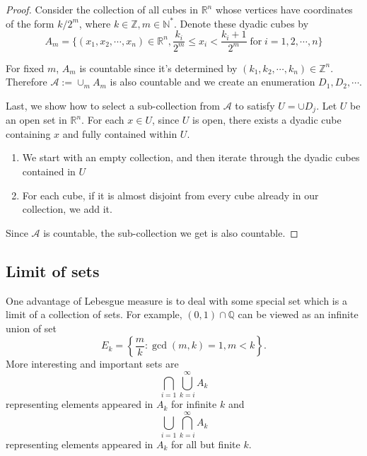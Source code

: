 \documentclass[dvipsnames]{article}
\numberwithin{equation}{section}
\begin{document}
\begin{proof}
Consider the collection of all cubes in $\mathbb{R}^n$ whose vertices have coordinates of the form $k/2^m$, where $k\in\mathbb{Z}, m\in\mathbb{N}^{*}$. Denote these dyadic cubes by 
$$
A_{m}= \{(x_1, x_2, \cdots, x_{n})\in\mathbb{R}^{n}, \frac{k_i}{2^m}\leq x_{i} <\frac{k_i+1}{2^{m}}\;\text{for}\; i=1,2,\cdots, n\}
$$ 

For fixed $m$, $A_{m}$ is countable since it's determined by $(k_1, k_2,\cdots, k_{n})\in\mathbb{Z}^{n}$. Therefore $\mathcal{A}:=\cup_{m} A_{m}$ is also countable and we create an enumeration $D_{1}, D_{2},\cdots$. 

Last, we show how to select a sub-collection from $\mathcal{A}$ to satisfy $U = \cup D_{j}$. 
Let $U$ be an open set in $\mathbb{R}^n$. For each $x \in U$, since $U$ is open, there exists a dyadic cube containing $x$ and fully contained within $U$.

\begin{enumerate}
    \item We start with an empty collection, and then iterate through the dyadic cubes contained in $U$

    \item For each cube, if it is almost disjoint from every cube already in our collection, we add it.
    \begin{center}
    
    \end{center}
\end{enumerate}
Since $\mathcal{A}$ is countable, the sub-collection we get is also countable.
\end{proof}

\subsection{Limit of sets}

One advantage of Lebesgue measure is to deal with some special set which is a limit of a collection of sets. For example,
$(0,1) \cap \mathbb{Q}$ can be viewed as an infinite union of set
$$
E_{k} = \left\{\frac{m}{k}: \operatorname{gcd}(m,k)=1, m<k \right\}.
$$
More interesting and important sets are
$$
\bigcap_{i=1} \bigcup_{k=i}^{\infty} A_{k}
$$
representing elements appeared in $A_{k}$ for infinite $k$ and
\begin{equation}
\label{basic_set2}
    \bigcup_{i=1} \bigcap_{k=i}^{\infty} A_{k}
\end{equation}
representing elements appeared in $A_{k}$ for all but finite $k$.
\end{document}

